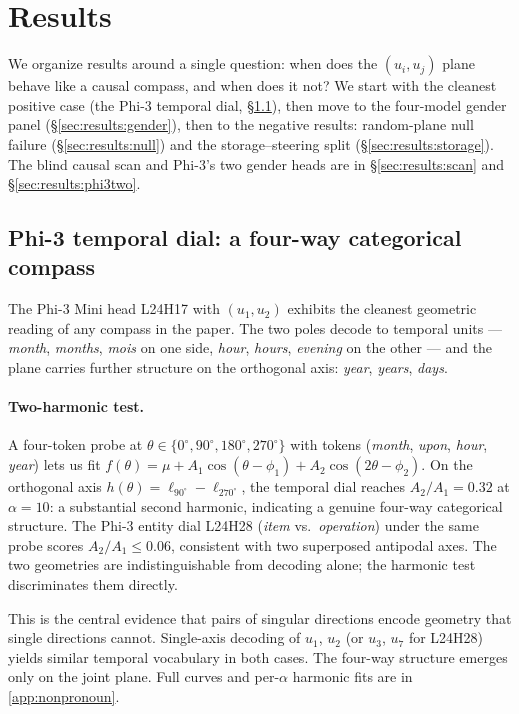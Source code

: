 \section{Results}
\label{sec:results}

We organize results around a single question: when does the
$(u_i, u_j)$ plane behave like a causal compass, and when does it
not? We start with the cleanest positive case (the Phi-3 temporal
dial, \S\ref{sec:results:harmonic}), then move to the four-model
gender panel (\S\ref{sec:results:gender}), then to the negative
results: random-plane null failure (\S\ref{sec:results:null}) and
the storage--steering split (\S\ref{sec:results:storage}). The
blind causal scan and Phi-3's two gender heads are in
\S\ref{sec:results:scan} and \S\ref{sec:results:phi3two}.

\subsection{Phi-3 temporal dial: a four-way categorical compass}
\label{sec:results:harmonic}

The Phi-3 Mini head L24H17 with $(u_1, u_2)$ exhibits the cleanest
geometric reading of any compass in the paper. The two poles decode
to temporal units --- \emph{month}, \emph{months}, \emph{mois} on
one side, \emph{hour}, \emph{hours}, \emph{evening} on the other ---
and the plane carries further structure on the orthogonal axis:
\emph{year}, \emph{years}, \emph{days}.

\paragraph{Two-harmonic test.}
A four-token probe at $\theta \in \{0^\circ, 90^\circ, 180^\circ,
270^\circ\}$ with tokens (\emph{month}, \emph{upon}, \emph{hour},
\emph{year}) lets us fit
$f(\theta) = \mu + A_1 \cos(\theta - \phi_1) +
A_2 \cos(2\theta - \phi_2)$.
On the orthogonal axis $h(\theta) = \ell_{90^\circ} -
\ell_{270^\circ}$, the temporal dial reaches $A_2/A_1 = 0.32$ at
$\alpha = 10$: a substantial second harmonic, indicating a genuine
four-way categorical structure. The Phi-3 entity dial L24H28
(\emph{item} vs.\ \emph{operation}) under the same probe scores
$A_2/A_1 \leq 0.06$, consistent with two superposed antipodal axes.
The two geometries are indistinguishable from decoding alone; the
harmonic test discriminates them directly.

This is the central evidence that pairs of singular directions
encode geometry that single directions cannot. Single-axis
decoding of $u_1$, $u_2$ (or $u_3$, $u_7$ for L24H28) yields
similar temporal vocabulary in both cases. The four-way structure
emerges only on the joint plane. Full curves and per-$\alpha$
harmonic fits are in \cref{app:nonpronoun}.

